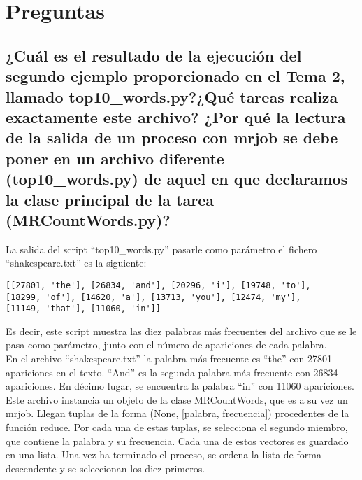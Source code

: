 \documentclass[12pt,a4paper,twoside,openright,titlepage,final]{article}
\author{José Ignacio Escribano}
\title{}
\begin{document}
\setcounter{page}{1}


\tableofcontents
\thispagestyle{empty}
\newpage

\setcounter{page}{1}


\section{Preguntas}

\subsection{¿Cuál es el resultado de la ejecución del segundo ejemplo proporcionado en el Tema 2, llamado top10\_words.py?¿Qué tareas realiza exactamente este archivo? ¿Por qué la lectura de la salida de un proceso con mrjob se debe poner en un archivo diferente (top10\_words.py) de aquel en que declaramos la clase principal de la tarea (MRCountWords.py)?}

La salida del script ``top10\_words.py'' pasarle como parámetro el fichero ``shakespeare.txt'' es la siguiente:

\begin{verbatim}
[[27801, 'the'], [26834, 'and'], [20296, 'i'], [19748, 'to'], 
[18299, 'of'], [14620, 'a'], [13713, 'you'], [12474, 'my'], 
[11149, 'that'], [11060, 'in']]
\end{verbatim}

Es decir, este script muestra las diez palabras más frecuentes del archivo que se le pasa como parámetro, junto con el número de apariciones de cada palabra.\\

En el archivo ``shakespeare.txt'' la palabra más frecuente es ``the'' con 27801 apariciones en el texto. ``And'' es la segunda palabra más frecuente con 26834 apariciones. En décimo lugar, se encuentra la palabra ``in'' con 11060 apariciones.\\

Este archivo instancia un objeto de la clase MRCountWords, que es a su vez un mrjob. Llegan tuplas de la forma (None, [palabra, frecuencia]) procedentes de la función reduce. Por cada una de estas tuplas, se selecciona el segundo miembro, que contiene la palabra y su frecuencia. Cada una de estos vectores es guardado en una lista. Una vez ha terminado el proceso, se ordena la lista de forma descendente y se seleccionan los diez primeros.\\
\end{document}
